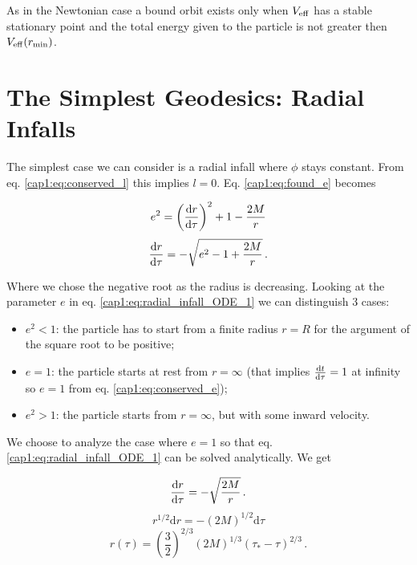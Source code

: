 As in the Newtonian case a bound orbit exists only when $V_{\rm eff}$ has a stable
stationary point and the total energy given to the particle is not greater then
$V_{\rm eff}(r_{\rm min})$.


\newpage


\section{The Simplest Geodesics: Radial Infalls}

The simplest case we can consider is a radial infall where $\phi$ stays
constant.
From eq. \ref{cap1:eq:conserved_l} this implies $l = 0$.
Eq. \ref{cap1:eq:found_e} becomes


\begin{equation*}
    e^2 = \left(\dv{r}{\tau}\right)^2 + 1 - \frac{2M}{r}
\end{equation*}
\begin{equation}
    \dv{r}{\tau} = - \sqrt{e^2 - 1 + \frac{2 M}{r}} \, .
    \label{cap1:eq:radial_infall_ODE_1}
\end{equation}

Where we chose the negative root as the radius is decreasing.
Looking at the parameter $e$ in eq. \ref{cap1:eq:radial_infall_ODE_1} we can
distinguish 3 cases:
\begin{itemize}
    \item{$e^2 < 1$:} the particle has to start from a finite radius $r = R$
        for the argument of the square root to be positive;
    \item{$e = 1$:} the particle starts at rest from $r = \infty$ (that implies
        $\dv{t}{\tau} = 1$ at infinity so $e = 1$ from eq. \ref{cap1:eq:conserved_e});
    \item{$e^2 > 1$:} the particle starts from $r = \infty$, but with some inward
        velocity.
\end{itemize}
We choose to analyze the case where $e = 1$ so that eq.
\ref{cap1:eq:radial_infall_ODE_1} can be solved analytically.
We get

\begin{equation}
    \dv{r}{\tau} = - \sqrt{\frac{2 M}{r}} \, .
    \label{cap1:eq:radial_infall_ODE_2}
\end{equation}
\begin{equation*}
    r^{1/2} \mathrm{d}r = -(2M)^{1/2} \mathrm{d}\tau
\end{equation*}
\begin{equation}
    r(\tau) = \left(\frac{3}{2}\right)^{2/3}
    (2M)^{1/3} (\tau_* - \tau)^{2/3} \, .
    \label{cap1:eq:radial_infall_r_of_tau}
\end{equation}

